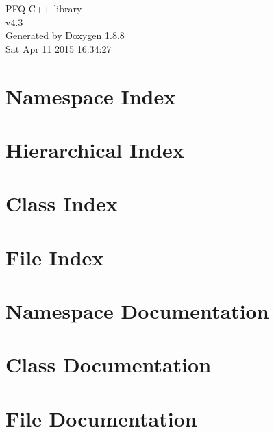 \documentclass[twoside]{book}
\newcommand{\+}{\discretionary{\mbox{\scriptsize$\hookleftarrow$}}{}{}}
\newcommand{\clearemptydoublepage}{%
  \newpage{\pagestyle{empty}\cleardoublepage}%
}
\begin{document}
\hypersetup{pageanchor=false,
             bookmarks=true,
             bookmarksnumbered=true,
             pdfencoding=unicode
            }
\begin{titlepage}
\vspace*{7cm}
\begin{center}%
{\Large P\+F\+Q C++ library \\[1ex]\large v4.\+3 }\\
\vspace*{1cm}
{\large Generated by Doxygen 1.8.8}\\
\vspace*{0.5cm}
{\small Sat Apr 11 2015 16:34:27}\\
\end{center}
\end{titlepage}
\clearemptydoublepage
\tableofcontents
\clearemptydoublepage
{}
\hypersetup{pageanchor=true}

\chapter{Namespace Index}

\chapter{Hierarchical Index}

\chapter{Class Index}

\chapter{File Index}

\chapter{Namespace Documentation}



\chapter{Class Documentation}















\chapter{File Documentation}





\newpage
{}
{}
\printindex
\end{document}
